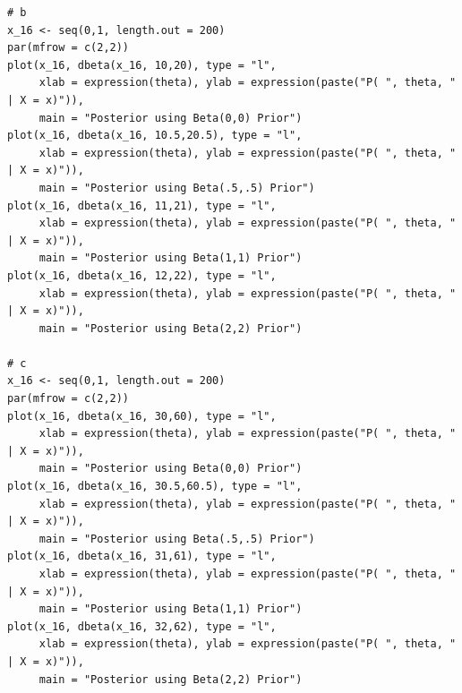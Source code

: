 \documentclass[12pt]{article}\usepackage[]{graphicx}\usepackage[]{color}
\begin{document}
\begin{verbatim}
# b
x_16 <- seq(0,1, length.out = 200)
par(mfrow = c(2,2))
plot(x_16, dbeta(x_16, 10,20), type = "l",
     xlab = expression(theta), ylab = expression(paste("P( ", theta, " | X = x)")),
     main = "Posterior using Beta(0,0) Prior")
plot(x_16, dbeta(x_16, 10.5,20.5), type = "l",
     xlab = expression(theta), ylab = expression(paste("P( ", theta, " | X = x)")),
     main = "Posterior using Beta(.5,.5) Prior")
plot(x_16, dbeta(x_16, 11,21), type = "l",
     xlab = expression(theta), ylab = expression(paste("P( ", theta, " | X = x)")),
     main = "Posterior using Beta(1,1) Prior")
plot(x_16, dbeta(x_16, 12,22), type = "l",
     xlab = expression(theta), ylab = expression(paste("P( ", theta, " | X = x)")),
     main = "Posterior using Beta(2,2) Prior")

# c
x_16 <- seq(0,1, length.out = 200)
par(mfrow = c(2,2))
plot(x_16, dbeta(x_16, 30,60), type = "l",
     xlab = expression(theta), ylab = expression(paste("P( ", theta, " | X = x)")),
     main = "Posterior using Beta(0,0) Prior")
plot(x_16, dbeta(x_16, 30.5,60.5), type = "l",
     xlab = expression(theta), ylab = expression(paste("P( ", theta, " | X = x)")),
     main = "Posterior using Beta(.5,.5) Prior")
plot(x_16, dbeta(x_16, 31,61), type = "l",
     xlab = expression(theta), ylab = expression(paste("P( ", theta, " | X = x)")),
     main = "Posterior using Beta(1,1) Prior")
plot(x_16, dbeta(x_16, 32,62), type = "l",
     xlab = expression(theta), ylab = expression(paste("P( ", theta, " | X = x)")),
     main = "Posterior using Beta(2,2) Prior")

\end{verbatim}
\end{document}
